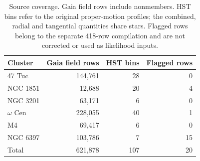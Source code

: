 \begin{table}[t]
\caption{Source coverage. Gaia field rows include nonmembers. HST bins refer to the original proper-motion profiles; the combined, radial and tangential quantities share stars. Flagged rows belong to the separate 418-row compilation and are not corrected or used as likelihood inputs.}\label{tab:cluster-coverage}
\centering\begin{tabular}{lrrr}
\toprule
Cluster & Gaia field rows & HST bins & Flagged rows \\
\midrule
47 Tuc & 144,761 & 28 & 0 \\
NGC 1851 & 12,688 & 20 & 4 \\
NGC 3201 & 63,171 & 6 & 0 \\
$\omega$ Cen & 228,055 & 40 & 1 \\
M4 & 69,417 & 6 & 0 \\
NGC 6397 & 103,786 & 7 & 15 \\
\midrule
Total & 621,878 & 107 & 20 \\
\bottomrule
\end{tabular}
\end{table}
